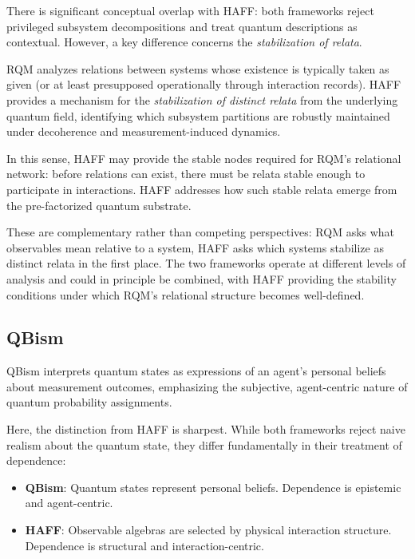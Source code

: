 \documentclass[12pt,a4paper,openany]{book}
\begin{document}
There is significant conceptual overlap with HAFF: both frameworks reject privileged subsystem decompositions and treat quantum descriptions as contextual. However, a key difference concerns the \emph{stabilization of relata}.

RQM analyzes relations between systems whose existence is typically taken as given (or at least presupposed operationally through interaction records). HAFF provides a mechanism for the \emph{stabilization of distinct relata} from the underlying quantum field, identifying which subsystem partitions are robustly maintained under decoherence and measurement-induced dynamics.

In this sense, HAFF may provide the stable nodes required for RQM's relational network: before relations can exist, there must be relata stable enough to participate in interactions. HAFF addresses how such stable relata emerge from the pre-factorized quantum substrate.

These are complementary rather than competing perspectives: RQM asks what observables mean relative to a system, HAFF asks which systems stabilize as distinct relata in the first place. The two frameworks operate at different levels of analysis and could in principle be combined, with HAFF providing the stability conditions under which RQM's relational structure becomes well-defined.

\subsection{QBism}

QBism \cite{Fuchs2014,FuchsMerminSchack2014} interprets quantum states as expressions of an agent's personal beliefs about measurement outcomes, emphasizing the subjective, agent-centric nature of quantum probability assignments.

Here, the distinction from HAFF is sharpest. While both frameworks reject naive realism about the quantum state, they differ fundamentally in their treatment of dependence:

\begin{itemize}
\item \textbf{QBism}: Quantum states represent personal beliefs. Dependence is epistemic and agent-centric.
\item \textbf{HAFF}: Observable algebras are selected by physical interaction structure. Dependence is structural and interaction-centric.
\end{itemize}
\end{document}
